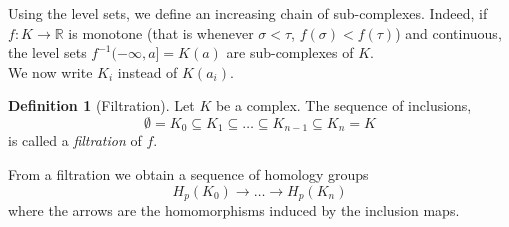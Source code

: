 \documentclass{article}
\newcommand{\R}{\mathbb{R}}
\newcommand{\inv}{^{-1}}
\theoremstyle{plain}
\theoremstyle{definition}
\newtheorem{definition}[thm]{Definition}
\theoremstyle{remark}
\begin{document}
Using the level sets, we define an increasing chain of sub-complexes. Indeed, if $f:K \to \R$ is monotone (that is whenever $\sigma < \tau$, $f(\sigma) < f(\tau)$) and continuous, the level sets $f\inv(-\infty, a] = K(a)$ are sub-complexes of $K$. \\
We now write $K_i$ instead of $K(a_i)$.
\begin{definition}[Filtration]
Let $K$ be a complex. The sequence of inclusions,
\[ \emptyset = K_0 \subseteq K_1 \subseteq \dots \subseteq K_{n-1} \subseteq K_n = K \] is called a \emph{filtration} of $f$.
\end{definition}

From a filtration we obtain a sequence of homology groups 
\[ H_p(K_0) \rightarrow \dots \rightarrow H_p(K_n) \] where the arrows are the homomorphisms induced by the inclusion maps.
\end{document}
